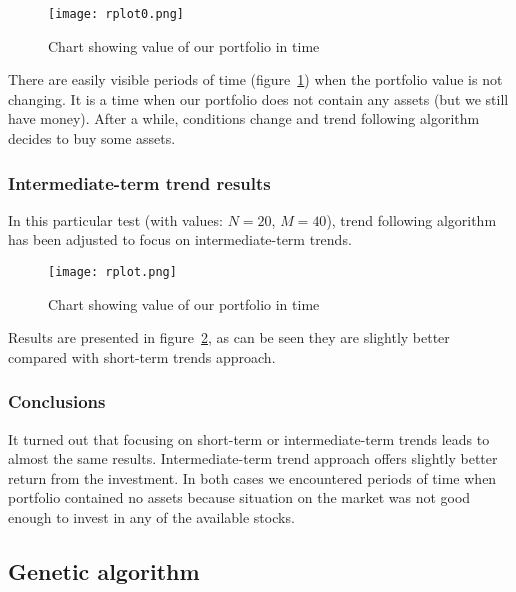 \begin{figure}[ht]
  
  \begin{center}
    \texttt{[image: rplot0.png]}
  \end{center}
  \caption{Chart showing value of our portfolio in time}
  \label{fig:trend-short}
\end{figure}

There are easily visible periods of time (figure~\ref{fig:trend-short}) when the portfolio value is not changing. 
It is a time when our portfolio does not contain any assets (but we still have money). 
After a while, conditions change and trend following algorithm decides to buy some assets.


\subsubsection{Intermediate-term trend results}
\label{trend-foll-inter}

In this particular test (with values: $N = 20$, $M = 40$), trend following algorithm has been adjusted to focus on intermediate-term trends.
 
\begin{figure}[H]
  \begin{center}
    \texttt{[image: rplot.png]}
  \end{center}
  \caption{Chart showing value of our portfolio in time}
  \label{fig:trend-int}
\end{figure}

Results are presented in figure~\ref{fig:trend-int}, as can be seen they are slightly better compared with short-term trends approach.  

\subsubsection{Conclusions}

It turned out that focusing on short-term or intermediate-term trends leads to almost the same results.
Intermediate-term trend approach offers slightly better return from the investment.
In both cases we encountered periods of time when portfolio contained no assets because situation on the market was not good enough to invest in any of the available stocks.



\subsection{Genetic algorithm}

